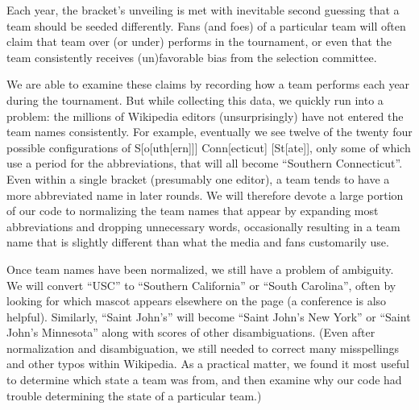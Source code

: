 \documentclass{article}
\begin{document}
Each year, the bracket's unveiling is met with inevitable second guessing that a team should be seeded differently.  Fans (and foes) of a particular team will often claim that team over (or under) performs in the tournament, or even that the team consistently receives (un)favorable bias from the selection committee.

We are able to examine these claims by recording how a team performs each year during the tournament.  But while collecting this data, we quickly run into a problem: the millions of Wikipedia editors (unsurprisingly) have not entered the team names consistently.  For example, eventually we see twelve of the twenty four possible configurations of S[o[uth[ern]]] Conn[ecticut] [St[ate]], only some of which use a period for the abbreviations, that will all become ``Southern Connecticut''.  Even within a single bracket (presumably one editor), a team tends to have a more abbreviated name in later rounds. We will therefore devote a large portion of our code to normalizing the team names that appear by expanding most abbreviations and dropping unnecessary words, occasionally resulting in a team name that is slightly different than what the media and fans customarily use.

Once team names have been normalized, we still have a problem of ambiguity.  We will convert ``USC'' to ``Southern California'' or ``South Carolina'', often by looking for which mascot appears elsewhere on the page (a conference is also helpful).  Similarly, ``Saint John's'' will become ``Saint John's New York'' or ``Saint John's Minnesota'' along with scores of other disambiguations.  (Even after normalization and disambiguation, we still needed to correct many misspellings and other typos within Wikipedia.  As a practical matter, we found it most useful to determine which state a team was from, and then examine why our code had trouble determining the state of a particular team.)
\end{document}
